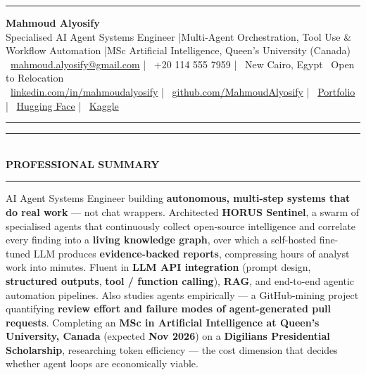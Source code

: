 \documentclass[10pt, a4paper]{article}
\newcommand{\faEnvelope}{}\newcommand{\faPhone}{}\newcommand{\faMapMarker}{}%
\newcommand{\faLinkedin}{}\newcommand{\faGithub}{}\newcommand{\faRobot}{}%
\newcommand{\faChartBar}{}\newcommand{\faGlobe}{}%
\newcommand{\cvsection}[1]{%
  \vspace{3pt}%
  {\color{navy}\rule{\linewidth}{1.1pt}}\\[0.5pt]%
  {\color{navy}\bfseries\fontsize{9.5}{11}\selectfont\uppercase{#1}}\\[-4pt]%
  {\color{teal}\rule{\linewidth}{0.6pt}}%
  \vspace{2pt}%
}
\begin{document}
\small

{\color{navy}\rule{\linewidth}{1.5pt}}

\vspace{3pt}
\begin{center}
  {\fontsize{21}{24}\bfseries\color{navy} Mahmoud Alyosify}\\[3pt]
  {\fontsize{10}{12}\color{teal}
    Specialised AI Agent Systems Engineer \enspace|\enspace Multi-Agent Orchestration, Tool Use \& Workflow Automation
    \enspace|\enspace MSc Artificial Intelligence, Queen's University (Canada)
}\\[4pt]
  {\color{midgray}
    \faEnvelope\ \href{mailto:mahmoud.alyosify@gmail.com}{mahmoud.alyosify@gmail.com}
    \enspace|\enspace
    \faPhone\ +20 114 555 7959
    \enspace|\enspace
    \faMapMarker\ New Cairo, Egypt \textperiodcentered\ Open to Relocation}\\[2pt]
  {\faLinkedin\ \href{https://linkedin.com/in/mahmoudalyosify}{linkedin.com/in/mahmoudalyosify}
    \enspace|\enspace
    \faGithub\ \href{https://github.com/MahmoudAlyosify}{github.com/MahmoudAlyosify}
    \enspace|\enspace
    \faGlobe\ \href{https://mahmoudalyosifysite.github.io/}{Portfolio}
    \enspace|\enspace
    \faRobot\ \href{https://huggingface.co/mahmoudalyosify}{Hugging Face}
    \enspace|\enspace
    \faChartBar\ \href{https://kaggle.com/mahmoudalyosify}{Kaggle}}
\end{center}

{\color{navy}\rule{\linewidth}{1.5pt}}

\vspace{2pt}

\cvsection{Professional Summary}

{\color{darkgray}\justifying
AI Agent Systems Engineer building \textbf{autonomous, multi-step systems that do real work} --- not chat wrappers. Architected \textbf{HORUS Sentinel}, a swarm of specialised agents that continuously collect open-source intelligence and correlate every finding into a \textbf{living knowledge graph}, over which a self-hosted fine-tuned LLM produces \textbf{evidence-backed reports}, compressing hours of analyst work into minutes. Fluent in \textbf{LLM API integration} (prompt design, \textbf{structured outputs}, \textbf{tool / function calling}), \textbf{RAG}, and end-to-end agentic automation pipelines. Also studies agents empirically --- a GitHub-mining project quantifying \textbf{review effort and failure modes of agent-generated pull requests}. Completing an \textbf{MSc in Artificial Intelligence at Queen's University, Canada} (expected \textbf{Nov 2026}) on a \textbf{Digilians Presidential Scholarship}, researching token efficiency --- the cost dimension that decides whether agent loops are economically viable.}
\end{document}
